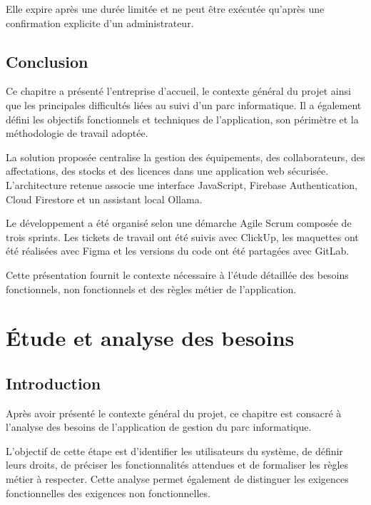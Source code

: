 \documentclass{rapportENSIAS}
\begin{document}
Elle expire après une durée limitée et ne peut être exécutée qu’après une confirmation explicite d’un administrateur.

\section{Conclusion}

Ce chapitre a présenté l’entreprise d’accueil, le contexte général du projet ainsi que les principales difficultés liées au suivi d’un parc informatique. Il a également défini les objectifs fonctionnels et techniques de l’application, son périmètre et la méthodologie de travail adoptée.

La solution proposée centralise la gestion des équipements, des collaborateurs, des affectations, des stocks et des licences dans une application web sécurisée. L’architecture retenue associe une interface JavaScript, Firebase Authentication, Cloud Firestore et un assistant local Ollama.

Le développement a été organisé selon une démarche Agile Scrum composée de trois sprints. Les tickets de travail ont été suivis avec ClickUp, les maquettes ont été réalisées avec Figma et les versions du code ont été partagées avec GitLab.

Cette présentation fournit le contexte nécessaire à l’étude détaillée des besoins fonctionnels, non fonctionnels et des règles métier de l’application.


\chapter{Étude et analyse des besoins}

\section{Introduction}

Après avoir présenté le contexte général du projet, ce chapitre est consacré à l’analyse des besoins de l’application de gestion du parc informatique.

L’objectif de cette étape est d’identifier les utilisateurs du système, de définir leurs droits, de préciser les fonctionnalités attendues et de formaliser les règles métier à respecter. Cette analyse permet également de distinguer les exigences fonctionnelles des exigences non fonctionnelles.
\end{document}
